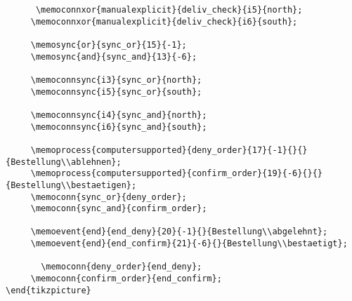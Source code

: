 \documentclass[12pt, a4paper]{article}
\begin{document}
\begin{lstlisting}
      \memoconnxor{manualexplicit}{deliv_check}{i5}{north};
     \memoconnxor{manualexplicit}{deliv_check}{i6}{south};
     
     \memosync{or}{sync_or}{15}{-1};
     \memosync{and}{sync_and}{13}{-6};
     
     \memoconnsync{i3}{sync_or}{north};
     \memoconnsync{i5}{sync_or}{south};
     
     \memoconnsync{i4}{sync_and}{north};
     \memoconnsync{i6}{sync_and}{south};
     
     \memoprocess{computersupported}{deny_order}{17}{-1}{}{}{Bestellung\\ablehnen};
     \memoprocess{computersupported}{confirm_order}{19}{-6}{}{}{Bestellung\\bestaetigen};
     \memoconn{sync_or}{deny_order};
     \memoconn{sync_and}{confirm_order};
     
     \memoevent{end}{end_deny}{20}{-1}{}{Bestellung\\abgelehnt};
     \memoevent{end}{end_confirm}{21}{-6}{}{Bestellung\\bestaetigt};
     
       \memoconn{deny_order}{end_deny};
     \memoconn{confirm_order}{end_confirm};
\end{tikzpicture}
\end{lstlisting}\newpage
\end{document}
